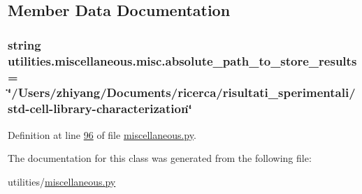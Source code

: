 \subsection{Member Data Documentation}
\hypertarget{classutilities_1_1miscellaneous_1_1misc_a27fd16369fd0995d7494ff4741de5b91}{}
\subsubsection[{absolute\+\_\+path\+\_\+to\+\_\+store\+\_\+results}]{\setlength{\rightskip}{0pt plus 5cm}string utilities.\+miscellaneous.\+misc.\+absolute\+\_\+path\+\_\+to\+\_\+store\+\_\+results = \char`\"{}/Users/zhiyang/Documents/ricerca/risultati\+\_\+sperimentali/std-\/cell-\/library-\/characterization\char`\"{}\hspace{0.3cm}{\ttfamily [static]}}\label{classutilities_1_1miscellaneous_1_1misc_a27fd16369fd0995d7494ff4741de5b91}


Definition at line \hyperlink{miscellaneous_8py_source_l00096}{96} of file \hyperlink{miscellaneous_8py_source}{miscellaneous.\+py}.



The documentation for this class was generated from the following file\+:\begin{DoxyCompactItemize}
\item 
utilities/\hyperlink{miscellaneous_8py}{miscellaneous.\+py}\end{DoxyCompactItemize}
